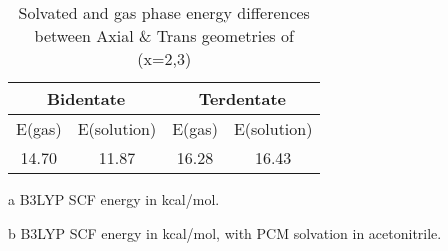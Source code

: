 \begin{table}[!h]
\centering
 \begin{threeparttable}
  \caption{Solvated and gas phase energy differences between Axial \& Trans geometries of  (x=2,3)}
    \begin{tabular}{cccc}
    \toprule
    \multicolumn{2}{c}{Bidentate} & \multicolumn{2}{c}{Terdentate} \\ \midrule
    E(gas)\tnote{a} & E(solution)\tnote{b} & E(gas)\tnote{a} & E(solution)\tnote{b} \\ \midrule
    14.70 & 11.87 & 16.28 & 16.43 \\
    \bottomrule
    \end{tabular}%
    \begin{tablenotes}
    \item [a] B3LYP SCF energy in kcal/mol.
    \item [b] B3LYP SCF energy in kcal/mol, with PCM solvation in acetonitrile.
    \end{tablenotes}
  \label{tab.cneng}%
 \end{threeparttable}
\end{table}%


